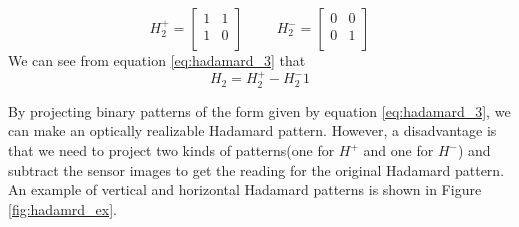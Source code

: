 \begin{equation}
H_2^+ = \begin{bmatrix} 
       1 & 1 \\
       1 & 0 \\
    \end{bmatrix}
   \hspace{1cm}
   H_2^- = \begin{bmatrix} 
       0 & 0 \\
       0 & 1 \\
    \end{bmatrix}
    \label{eq:hadamard_3}
\end{equation}
We can see from equation \ref{eq:hadamard_3} that 
\begin{equation}
H_2 = H_2^+ - H_2^-1
\label{eq:hadamard_4}
\end{equation}

By projecting binary patterns of the form given by equation \ref{eq:hadamard_3}, we can make an optically realizable Hadamard pattern. However, a disadvantage is that we need to project two kinds of patterns(one for $H^+$ and one for $H^-$) and subtract the sensor images to get the reading for the original Hadamard pattern. An example of vertical and horizontal Hadamard patterns is shown in Figure \ref{fig:hadamrd_ex}. 

